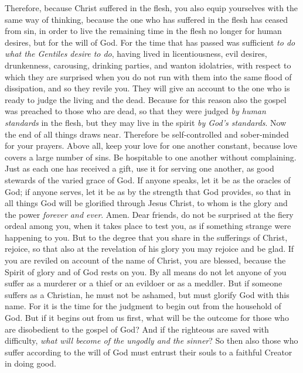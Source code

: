 \begin{biblechapter} %
 Therefore, because Christ suffered in the flesh, you also equip yourselves with the same way of thinking, because the one who has suffered in the flesh has ceased from sin,
\verse in order to live the remaining time in the flesh no longer for human desires, but for the will of God.
\verse For the time that has passed was sufficient \textit{to do what the Gentiles desire to do}, having lived in licentiousness, evil desires, drunkenness, carousing, drinking parties, and wanton idolatries,
\verse with respect to which they are surprised when you do not run with them into the same flood of dissipation, and so they revile you.
\verse They will give an account to the one who is ready to judge the living and the dead.
\verse Because for this reason also the gospel was preached to those who are dead, so that they were judged \textit{by human standards} in the flesh, but they may live in the spirit \textit{by God’s standards}.
 Now the end of all things draws near. Therefore be self-controlled and sober-minded for your prayers.
\verse Above all, keep your love for one another constant, because love covers a large number of sins.
\verse Be hospitable to one another without complaining.
\verse Just as each one has received a gift, use it for serving one another, as good stewards of the varied grace of God.
\verse If anyone speaks, let it be as the oracles of God; if anyone serves, let it be as by the strength that God provides, so that in all things God will be glorified through Jesus Christ, to whom is the glory and the power \textit{forever and ever}. Amen.
 Dear friends, do not be surprised at the fiery ordeal among you, when it takes place to test you, as if something strange were happening to you.
\verse But to the degree that you share in the sufferings of Christ, rejoice, so that also at the revelation of his glory you may rejoice and be glad.
\verse If you are reviled on account of the name of Christ, you are blessed, because the Spirit of glory and of God rests on you.
\verse By all means do not let anyone of you suffer as a murderer or a thief or an evildoer or as a meddler.
\verse But if someone suffers as a Christian, he must not be ashamed, but must glorify God with this name.
\verse For it is the time for the judgment to begin out from the household of God. But if it begins out from us first, what will be the outcome for those who are disobedient to the gospel of God?
\verse And if the righteous are saved with difficulty, \textit{what will become of the ungodly and the sinner}?
\verse So then also those who suffer according to the will of God must entrust their souls to a faithful Creator in doing good.
\end{biblechapter}

